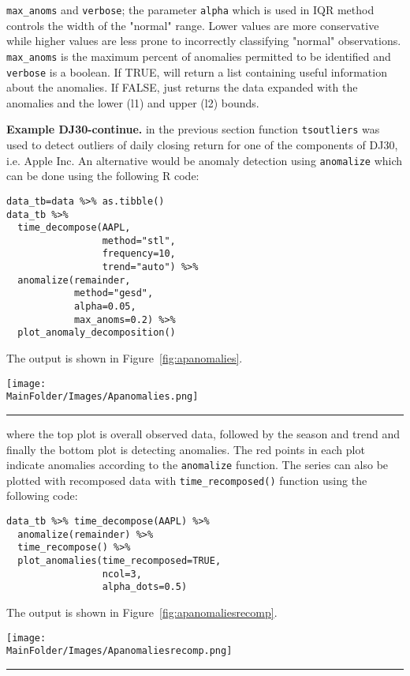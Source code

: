 \verb|max_anoms| and \verb|verbose|; the parameter \verb|alpha| which is used in IQR method controls the width of the "normal" range. Lower values are more conservative while higher values are less prone to incorrectly classifying "normal" observations. \verb|max_anoms| is the maximum percent of anomalies permitted to be identified and \verb|verbose| is a boolean. If TRUE, will return a list containing useful information about the anomalies. If FALSE, just returns the data expanded with the anomalies and the lower (l1) and upper (l2) bounds. \par \textbf{Example DJ30-continue.} in the previous section function \verb|tsoutliers| was used to detect outliers of daily closing return for one of the components of DJ30, i.e. Apple Inc. An alternative would be anomaly detection using \verb+anomalize+ which can be done using the following R code: 
\begin{lstlisting}
data_tb=data %>% as.tibble()
data_tb %>% 
  time_decompose(AAPL,
                 method="stl",
                 frequency=10,
                 trend="auto") %>%
  anomalize(remainder,
            method="gesd",
            alpha=0.05,
            max_anoms=0.2) %>%
  plot_anomaly_decomposition()
\end{lstlisting}

The output is shown in Figure~\ref{fig:apanomalies}.
\begin{figure*}[H]
\centering
\texttt{[image: \\MainFolder/Images/Apanomalies.png]}\label{fig:apanomalies}
\caption[\small Anomaly detection for Apple Inc. daily closing return]{\small Anomaly detection for Apple Inc. daily closing return.}
\hrule
\end{figure*}
\afterpage{\FloatBarrier}
where the top plot is overall observed data, followed by the season and trend and finally the bottom plot is detecting anomalies. The red points in each plot indicate anomalies according to the \verb|anomalize| function.  The series can also be plotted with recomposed data with \verb|time_recomposed()| function using the following code:
\begin{verbatim}
data_tb %>% time_decompose(AAPL) %>% 
  anomalize(remainder) %>% 
  time_recompose() %>%  
  plot_anomalies(time_recomposed=TRUE,
                 ncol=3,
                 alpha_dots=0.5)
\end{verbatim}
The output is shown in Figure~\ref{fig:apanomaliesrecomp}.
\begin{figure*}[H]
\centering
\texttt{[image: \\MainFolder/Images/Apanomaliesrecomp.png]}
\caption[\small Anomaly detection for Apple Inc. daily closing return with recomposed data]{\small Anomaly detection for Apple Inc. daily closing return with recomposed data. The grey portion explains the expected trend.}
\hrule\label{fig:apanomaliesrecomp}
\end{figure*}

